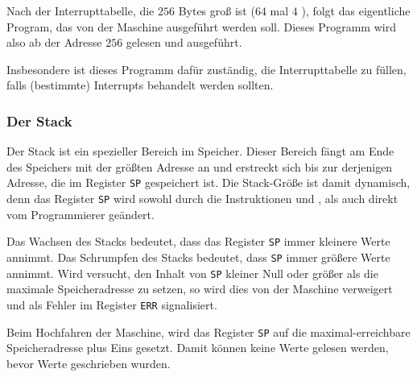 Nach der Interrupttabelle, die $256$ Bytes groß ist ($64$ mal $4$ ),
folgt das eigentliche Program, das von der Maschine ausgeführt werden soll.
Dieses Programm wird also ab der Adresse $256$ gelesen und ausgeführt.

Insbesondere ist dieses Programm dafür zuständig, die Interrupttabelle zu
füllen, falls (bestimmte) Interrupts behandelt werden sollten.



\subsubsection{Der Stack}
\label{subsubsec:Stack}

Der Stack ist ein spezieller Bereich im Speicher. Dieser Bereich fängt am Ende
des Speichers mit der größten Adresse an und erstreckt sich bis zur derjenigen
Adresse, die im Register \texttt{SP} gespeichert ist. Die Stack-Größe ist damit
dynamisch, denn das Register \texttt{SP} wird sowohl durch die Instruktionen
 und , als auch direkt vom Programmierer geändert.

Das Wachsen des Stacks bedeutet, dass das Register
\texttt{SP} immer kleinere Werte annimmt. Das Schrumpfen
des Stacks bedeutet, dass \texttt{SP} immer größere Werte annimmt. Wird
versucht, den Inhalt von \texttt{SP} kleiner Null oder größer als die maximale
Speicheradresse zu setzen, so wird dies von der Maschine verweigert und als
Fehler im Register \texttt{ERR} signalisiert.

Beim Hochfahren der Maschine, wird das Register \texttt{SP} auf die
maximal-erreichbare Speicheradresse plus Eins gesetzt. Damit können keine Werte
gelesen werden, bevor Werte geschrieben wurden.


